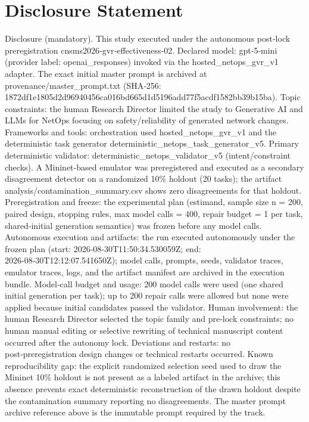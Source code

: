 \documentclass[conference]{IEEEtran}
\begin{document}
\section*{Disclosure Statement}
Disclosure (mandatory). This study executed under the autonomous post‑lock preregistration cnsms2026‑gvr‑effectiveness‑02. Declared model: gpt‑5‑mini (provider label: openai\_responses) invoked via the hosted\_netops\_gvr\_v1 adapter. The exact initial master prompt is archived at provenance/master\_prompt.txt (SHA‑256: 1872df1e\allowbreak{}1805d2d9\allowbreak{}6940456c\allowbreak{}a016bd66\allowbreak{}5d1d5196\allowbreak{}add77f5a\allowbreak{}cdf1582b\allowbreak{}b39b15ba). Topic constraints: the human Research Director limited the study to Generative AI and LLMs for NetOps focusing on safety/reliability of generated network changes. Frameworks and tools: orchestration used hosted\_netops\_gvr\_v1 and the deterministic task generator deterministic\_netops\_task\_generator\_v5. Primary deterministic validator: deterministic\_netops\_validator\_v5 (intent/constraint checks). A Mininet‑based emulator was preregistered and executed as a secondary disagreement detector on a randomized 10\% holdout (20 tasks); the artifact analysis/contamination\_summary.csv shows zero disagreements for that holdout. Preregistration and freeze: the experimental plan (estimand, sample size n = 200, paired design, stopping rules, max model calls = 400, repair budget = 1 per task, shared‑initial generation semantics) was frozen before any model calls. Autonomous execution and artifacts: the run executed autonomously under the frozen plan (start: 2026‑08‑30T11:50:34.530059Z; end: 2026‑08‑30T12:12:07.541650Z); model calls, prompts, seeds, validator traces, emulator traces, logs, and the artifact manifest are archived in the execution bundle. Model‑call budget and usage: 200 model calls were used (one shared initial generation per task); up to 200 repair calls were allowed but none were applied because initial candidates passed the validator. Human involvement: the human Research Director selected the topic family and pre‑lock constraints; no human manual editing or selective rewriting of technical manuscript content occurred after the autonomy lock. Deviations and restarts: no post‑preregistration design changes or technical restarts occurred. Known reproducibility gap: the explicit randomized selection seed used to draw the Mininet 10\% holdout is not present as a labeled artifact in the archive; this absence prevents exact deterministic reconstruction of the drawn holdout despite the contamination summary reporting no disagreements. The master prompt archive reference above is the immutable prompt required by the track.
\end{document}
